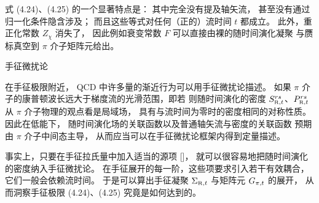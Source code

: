 式 (4.24)、(4.25) 的一个显著特点是：
其中完全没有提及轴矢流，
甚至没有通过归一化条件隐含涉及；
而且这些等式对任何（正的）流时间 $t$ 都成立。
此外，重正化常数 $Z_{\chi}$ 消失了，
因此例如衰变常数 $F$
可以直接由裸的随时间演化凝聚
与赝标真空到 $\pi$ 介子矩阵元给出。


 手征微扰论

在手征极限附近，
QCD 中许多量的渐近行为可以用手征微扰论描述。
如果 $\pi$ 介子的康普顿波长远大于梯度流的光滑范围，即若
则随时间演化的密度 $\rens{S}{t}^{rs}$、$\rens{P}{t}^{rs}$
从 $\pi$ 介子物理的观点看是局域场，
具有与流时间为零时的密度相同的对称性质。
因此在低能下，
随时间演化场的关联函数以及普通轴矢流与密度的关联函数
预期由 $\pi$ 介子中间态主导，
从而应当可以在手征微扰论框架内得到定量描述。

事实上，只要在手征拉氏量中加入适当的源项
[\cite{ChPT}]，
就可以很容易地把随时间演化的密度纳入手征微扰论。
在手征展开的每一阶，这些项要求引入若干有效耦合，
它们一般会依赖流时间。
于是可以算出手征凝聚 $\rens{\Sigma}{t}$
与矩阵元 $G_{\pi,t}$ 的展开，
从而洞察手征极限 (4.24)、(4.25)
究竟是如何达到的。
